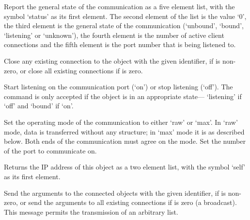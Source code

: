 

\objItemCommands[]

  \objListCmdBegin

  Report the general state of the communication as a five element list, with the symbol `status' as
  its first element.
  The second element of the list is the value `0', the third element is the general state of the
  communication (`unbound', `bound', `listening' or `unknown'), the fourth element is the number of
  active client connections and the fifth element is the port number that is being listened to.

  Close any existing connection to the  object with the given identifier,
  if  is non-zero, or close all existing connections if  is zero.

  Start listening on the communication port (`on') or stop listening (`off').
  The command is only accepted if the  object is in an appropriate state---
  `listening' if `off' and `bound' if `on'.

  Set the operating mode of the communication to either `raw' or `max'.
  In `raw' mode, data is transferred without any structure; in `max' mode it is as described below.
  Both ends of the communication must agree on the mode.
  Set the number of the port to communicate on.

  Returns the IP address of this object as a two element list, with the symbol `self' as its first
  element.
  
  Send the arguments to the connected  objects with the given identifier,
  if  is non-zero, or send the arguments to all existing connections if
   is zero (a broadcast).
  This message permits the transmission of an arbitrary list.

